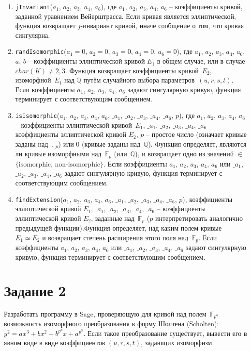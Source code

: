 \documentclass[11pt]{exam}
\theoremstyle{definition}
\begin{document}
{\begin{enumerate}
	\item \texttt{jInvariant}($a_1$, $a_2$, $a_3$, $a_4$, $a_6$), где $a_1$, $a_2$, $a_3$, $a_4$, $a_6$ -- коэффициенты кривой, заданной уравнением Вейерштрасса. Если кривая является эллиптической, функция возвращает $j$-инвариант кривой, иначе сообщение о том, что кривая сингулярна.
	\item \texttt{randIsomorphic}($a_1 = 0$, $a_2 = 0$, $a_3 = 0$, $a_4 = 0$, $a_6 = 0$), где $a_1$, $a_2$, $a_3$, $a_4$, $a_6$, $a$, $b$ -- коэффициенты эллиптической кривой $E_1$ в общем случае, или в случае $char(K)\neq 2, 3$. Функция возвращает коэффициенты кривой~$E_2$, изоморфной~$E_1$ над $\mathbb{Q}$ путём случайного выбора параметров~$(u, r, s, t)$. Если коэффициенты $a_1$, $a_2$, $a_3$, $a_4$, $a_6$ задают сингулярную кривую, функция терминирует с соответствующим сообщением.
	\item \texttt{isIsomorphic}($a_1$, $a_2$, $a_3$, $a_4$, $a_6$, $\_a_1$, $\_a_2$, $\_a_3$, $\_a_4$, $\_a_6$, $p$), где $a_1$, $a_2$, $a_3$, $a_4$, $a_6$ -- коэффициенты эллиптической кривой~$E_1$, $\_a_1$, $\_a_2$, $\_a_3$, $\_a_4$, $\_a_6$ -- коэффициенты эллиптической кривой $E_2$, $p$ -- простое число (означает кривые заданы над~$\mathbb{F}_p$) или $0$ (кривые заданы над~$\mathbb{Q}$). Функция определяет, являются ли кривые изоморфными над~$\mathbb{F}_p$ (или~$\mathbb{Q}$), и возвращает одно из значений $\in$ $\{\text{isomorphic, non-isomorphic}\}$. Если коэффициенты $a_1$, $a_2$, $a_3$, $a_4$, $a_6$ или $\_a_1$, $\_a_2$, $\_a_3$, $\_a_4$, $\_a_6$ задают сингулярную кривую, функция терминирует с соответствующим сообщением.
	\item \texttt{findExtension}($a_1$, $a_2$, $a_3$, $a_4$, $a_6$, $\_a_1$, $\_a_2$, $\_a_3$, $\_a_4$, $\_a_6$, $p$), коэффициенты эллиптической кривой $E_1$,
	$\_a_1$, $\_a_2$, $\_a_3$, $\_a_4$, $\_a_6$ -- коэффициенты эллиптической кривой $E_2$, заданные над~$\mathbb{F}_p$ ($p$ интерпретировать аналогично предыдущей функции).Функция определяет, над каким полем кривые~$E_1 \simeq E_2$ и возвращает степень расширения этого поля над~$\mathbb{F}_p$. Если коэффициенты $a_1$, $a_2$, $a_3$, $a_4$, $a_6$ или $\_a_1$, $\_a_2$, $\_a_3$, $\_a_4$, $\_a_6$ задают сингулярную кривую, функция терминирует с соответствующим сообщением.
\end{enumerate}

\section*{Задание 2}
Разработать программу в Sage, проверяющую для кривой над полем~$\mathbb{F}_{p^6}$ возможность изоморфного преобразования в форму Шолтена (Scholten): $y^2 = a x^3 + b x^2 + b^{p^3} x + a^{p^3}$. Если такое преобразование существует, вывести его в явном виде в виде коэффициентов $(u, r, s, t)$, задающих изоморфизм.

}
\end{document}
